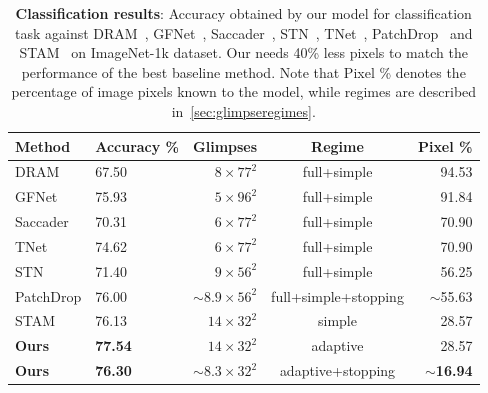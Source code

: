\begin{table}[t]
  \caption{\textbf{Classification results}: Accuracy obtained by our model for classification task against DRAM~\cite{ba2015multiple}, GFNet~\cite{wang2020glance}, Saccader~\cite{elsayed2019saccader}, STN~\cite{recasens2018learning}, TNet~\cite{papadopoulos2021hard}, PatchDrop~\cite{uzkent2020learning} and STAM~\cite{rangrej2022consistency} on ImageNet-1k dataset. Our \ours{} needs 40\% less pixels to match the performance of the best baseline method. Note that Pixel \% denotes the percentage of image pixels known to the model, while regimes are described in~\cref{sec:glimpseregimes}.}
  \label{tab:classification}
  \vspace{-.2cm}
\begin{center}
\begin{small}
  \begin{tabular}{l@{\hskip12pt}l@{\hskip12pt}r@{\hskip12pt}c@{\hskip12pt}r} 
    \toprule
    Method & Accuracy \% & Glimpses & Regime & Pixel \%  \\ 
    \midrule
    DRAM & 67.50 & $8 \times 77^2$ & full+simple & 94.53 \\
    GFNet & 75.93 & $5 \times 96^2$ & full+simple & 91.84 \\
    Saccader & 70.31 & $6 \times 77^2$ & full+simple & 70.90 \\
    TNet & 74.62 & $6 \times 77^2$ & full+simple & 70.90 \\
    STN & 71.40 &  $9 \times 56^2$& full+simple & 56.25 \\
    PatchDrop & 76.00 &  $\sim8.9 \times 56^2$ & full+simple+stopping & $\sim$55.63 \\
    STAM & 76.13 & $14 \times 32^2$ & simple & 28.57\\
    \textbf{Ours} & \textbf{77.54} & $14 \times 32^2$ & adaptive & 28.57\\
    \textbf{Ours} & \textbf{76.30} &  $\sim8.3 \times 32^2$ & adaptive+stopping & $\sim$\textbf{16.94}\\
    \bottomrule
  \end{tabular}
\end{small}
\end{center}
\end{table}
